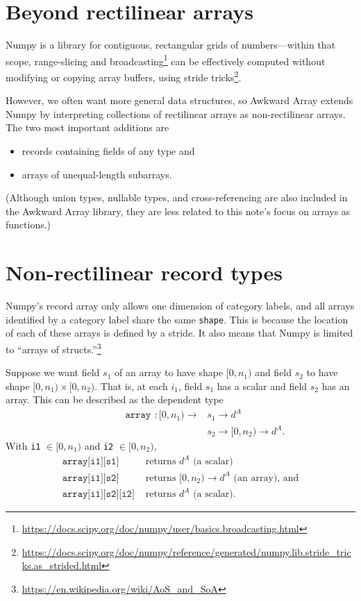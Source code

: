 \documentclass[12pt]{article}
\begin{document}
\section*{Beyond rectilinear arrays}

Numpy is a library for contiguous, rectangular grids of numbers---within that scope, range-slicing and broadcasting\footnote{\url{https://docs.scipy.org/doc/numpy/user/basics.broadcasting.html}} can be effectively computed without modifying or copying array buffers, using stride tricks\footnote{\url{https://docs.scipy.org/doc/numpy/reference/generated/numpy.lib.stride_tricks.as_strided.html}}.

However, we often want more general data structures, so Awkward Array extends Numpy by interpreting collections of rectilinear arrays as non-rectilinear arrays. The two most important additions are
\begin{itemize}
\item records containing fields of any type and
\item arrays of unequal-length subarrays.
\end{itemize}
\noindent (Although union types, nullable types, and cross-referencing are also included in the Awkward Array library, they are less related to this note's focus on arrays as functions.)

\vfill

\section*{Non-rectilinear record types}

Numpy's record array only allows one dimension of category labels, and all arrays identified by a category label share the same \texttt{shape}. This is because the location of each of these arrays is defined by a stride. It also means that Numpy is limited to ``arrays of structs.''\footnote{\url{https://en.wikipedia.org/wiki/AoS_and_SoA}}

Suppose we want field $s_1$ of an array to have shape $[0, n_1)$ and field $s_2$ to have shape $[0, n_1) \times [0, n_2)$. That is, at each $i_1$, field $s_1$ has a scalar and field $s_2$ has an array. This can be described as the dependent type
\begin{align*}
\phantom{\mbox{ufunc}(f)(}\texttt{array}\phantom{)}: [0, n_1) \to & s_1 \to d^A \\
 & s_2 \to [0, n_2) \to d^A\mbox{.}
\end{align*}
With \texttt{i1} $\in [0, n_1)$ and \texttt{i2} $\in [0, n_2)$,
\begin{align*}
\texttt{array[i1][s1]} & \mbox{ returns } d^A\mbox{ (a scalar)} \\
\texttt{array[i1][s2]} & \mbox{ returns } [0, n_2) \to d^A\mbox{ (an array), and} \\
\texttt{array[i1][s2][i2]} & \mbox{ returns } d^A\mbox{ (a scalar).}
\end{align*}
\end{document}
